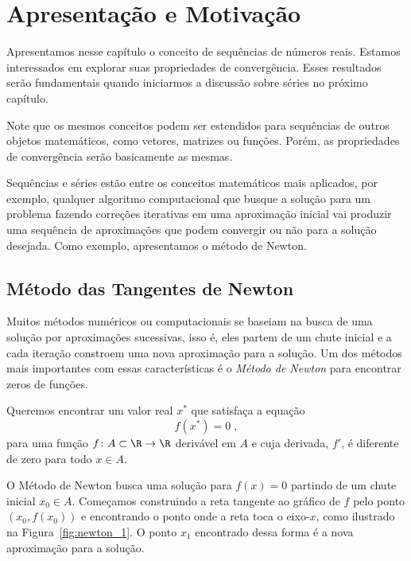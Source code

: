 \section{Apresentação e Motivação}

Apresentamos nesse capítulo o conceito de sequências de números reais.
Estamos interessados em explorar suas propriedades de convergência.
Esses resultados serão fundamentais quando iniciarmos a discussão sobre séries
no próximo capítulo.

Note que os mesmos conceitos podem ser estendidos para sequências
de outros objetos matemáticos, como vetores, matrizes ou funções.
Porém, as propriedades de convergência serão basicamente as mesmas.

Sequências e séries estão entre os conceitos matemáticos mais aplicados,
por exemplo, qualquer algoritmo computacional que busque a solução para
um problema fazendo correções iterativas em uma aproximação inicial vai produzir
uma sequência de aproximações que podem convergir ou não para a solução desejada.
Como exemplo, apresentamos o método de Newton.

\subsection*{Método das Tangentes de Newton}

Muitos métodos numéricos ou computacionais se baseiam na busca de uma solução
por aproximações sucessivas, isso é, eles partem de um chute inicial e
a cada iteração constroem uma nova aproximação para a solução.
Um dos métodos mais importantes com essas características é o
\emph{Método de Newton}
para encontrar zeros de funções.

Queremos encontrar um valor real $x^\ast$ que satisfaça a equação
\[
	f(x^\ast) = 0 \;,
\]
para uma função $f\colon A\subset\R\to\R$ derivável em $A$ e
cuja derivada, $f'$, é diferente de zero para todo $x\in A$.

O Método de Newton busca uma solução para $f(x)=0$ partindo de um chute inicial
$x_0\in A$. Começamos construindo a reta tangente ao gráfico de $f$ pelo ponto
$(x_0, f(x_0))$ e encontrando o ponto onde a reta toca o eixo-$x$, como ilustrado
na Figura~\ref{fig:newton_1}. O ponto $x_1$ encontrado dessa forma é a nova
aproximação para a solução.

